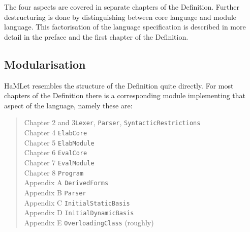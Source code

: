 \documentclass[twoside,titlepage]{article}
\begin{document}
The four aspects are covered in separate chapters of the Definition. Further destructuring is done by distinguishing between core language and module language. This factorisation of the language specification is described in more detail in the preface and the first chapter of the Definition.

%
%


\subsection{Modularisation}
\label{modularisation}

HaMLet resembles the structure of the Definition quite directly. For most chapters of the Definition there is a corresponding module implementing that aspect of the language, namely these are:

\begin{quote}
\begin{tabbing}
Chapter 2 and 3\qquad\= {\tt Lexer}, {\tt Parser}, {\tt SyntacticRestrictions} \\
Chapter 4	\> {\tt ElabCore} \\
Chapter 5	\> {\tt ElabModule} \\
Chapter 6	\> {\tt EvalCore} \\
Chapter 7	\> {\tt EvalModule} \\
Chapter 8	\> {\tt Program} \\
Appendix A	\> {\tt DerivedForms} \\
Appendix B	\> {\tt Parser} \\
Appendix C	\> {\tt InitialStaticBasis} \\
Appendix D	\> {\tt InitialDynamicBasis} \\
Appendix E	\> {\tt OverloadingClass} (roughly)
\end{tabbing}
\end{quote}
\end{document}

